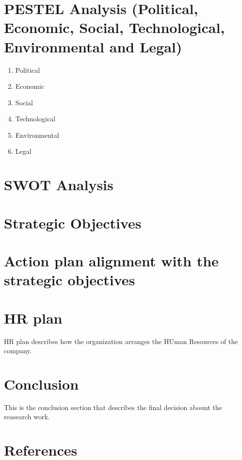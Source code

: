 \documentclass[12pt]{article}
\begin{document}
\section{PESTEL Analysis (Political, Economic, Social, Technological, Environmental and Legal)}
\begin{enumerate}
    \item Political
    \item Economic
    \item Social
    \item Technological
    \item Environmental
    \item Legal
\end{enumerate}


\section{SWOT Analysis}
\section{Strategic Objectives}
\section{Action plan alignment with the strategic objectives}
\section{HR plan}
HR plan describes how the organization arranges the HUman Resources of the company.
\section{Conclusion}
This is the conclusion section that describes the final decision abount the reasearch work.
\section{References}
\end{document}
